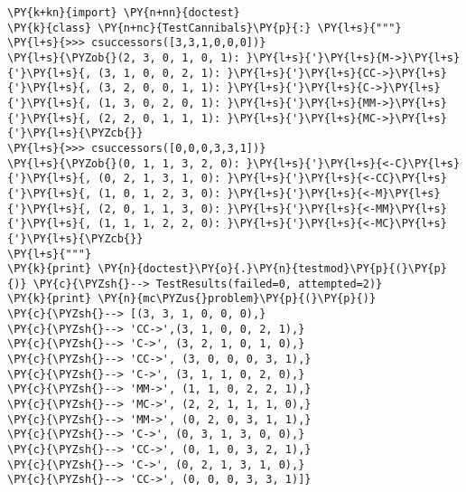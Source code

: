 \begin{Verbatim}[commandchars=\\\{\}]
\PY{k+kn}{import} \PY{n+nn}{doctest}
\PY{k}{class} \PY{n+nc}{TestCannibals}\PY{p}{:} \PY{l+s}{"""}
\PY{l+s}{>>> csuccessors([3,3,1,0,0,0])}
\PY{l+s}{\PYZob{}(2, 3, 0, 1, 0, 1): }\PY{l+s}{'}\PY{l+s}{M->}\PY{l+s}{'}\PY{l+s}{, (3, 1, 0, 0, 2, 1): }\PY{l+s}{'}\PY{l+s}{CC->}\PY{l+s}{'}\PY{l+s}{, (3, 2, 0, 0, 1, 1): }\PY{l+s}{'}\PY{l+s}{C->}\PY{l+s}{'}\PY{l+s}{, (1, 3, 0, 2, 0, 1): }\PY{l+s}{'}\PY{l+s}{MM->}\PY{l+s}{'}\PY{l+s}{, (2, 2, 0, 1, 1, 1): }\PY{l+s}{'}\PY{l+s}{MC->}\PY{l+s}{'}\PY{l+s}{\PYZcb{}}
\PY{l+s}{>>> csuccessors([0,0,0,3,3,1])}
\PY{l+s}{\PYZob{}(0, 1, 1, 3, 2, 0): }\PY{l+s}{'}\PY{l+s}{<-C}\PY{l+s}{'}\PY{l+s}{, (0, 2, 1, 3, 1, 0): }\PY{l+s}{'}\PY{l+s}{<-CC}\PY{l+s}{'}\PY{l+s}{, (1, 0, 1, 2, 3, 0): }\PY{l+s}{'}\PY{l+s}{<-M}\PY{l+s}{'}\PY{l+s}{, (2, 0, 1, 1, 3, 0): }\PY{l+s}{'}\PY{l+s}{<-MM}\PY{l+s}{'}\PY{l+s}{, (1, 1, 1, 2, 2, 0): }\PY{l+s}{'}\PY{l+s}{<-MC}\PY{l+s}{'}\PY{l+s}{\PYZcb{}}
\PY{l+s}{"""}
\PY{k}{print} \PY{n}{doctest}\PY{o}{.}\PY{n}{testmod}\PY{p}{(}\PY{p}{)} \PY{c}{\PYZsh{}--> TestResults(failed=0, attempted=2)}
\PY{k}{print} \PY{n}{mc\PYZus{}problem}\PY{p}{(}\PY{p}{)}
\PY{c}{\PYZsh{}--> [(3, 3, 1, 0, 0, 0),}
\PY{c}{\PYZsh{}--> 'CC->',(3, 1, 0, 0, 2, 1),}
\PY{c}{\PYZsh{}--> 'C->', (3, 2, 1, 0, 1, 0),}
\PY{c}{\PYZsh{}--> 'CC->', (3, 0, 0, 0, 3, 1),}
\PY{c}{\PYZsh{}--> 'C->', (3, 1, 1, 0, 2, 0),}
\PY{c}{\PYZsh{}--> 'MM->', (1, 1, 0, 2, 2, 1),}
\PY{c}{\PYZsh{}--> 'MC->', (2, 2, 1, 1, 1, 0),}
\PY{c}{\PYZsh{}--> 'MM->', (0, 2, 0, 3, 1, 1),}
\PY{c}{\PYZsh{}--> 'C->', (0, 3, 1, 3, 0, 0),}
\PY{c}{\PYZsh{}--> 'CC->', (0, 1, 0, 3, 2, 1),}
\PY{c}{\PYZsh{}--> 'C->', (0, 2, 1, 3, 1, 0),}
\PY{c}{\PYZsh{}--> 'CC->', (0, 0, 0, 3, 3, 1)]}
\end{Verbatim}
